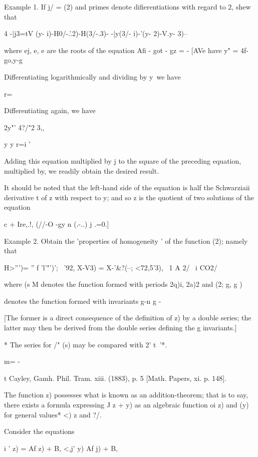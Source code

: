{Example 1. If j/ = (2) and primes denote difierentiations with regard
to 2, shew that

4 -|j3=tV (y- i)-H0/-.'.2)-H(3/-.3)- -|y(3/- i)-'(y- 2)-V.y- 3)--\

where ej, e, e are the roots of the equation Afi - got - gz = - [AVe
have y" = 4f-go,y-g

Differentiating logarithmically and dividing by y\ we have

r=\

Differentiating again, we have

2y"' 4?/"2 3,,

y y r=i '

Adding this equation multiplied by j to the square of the preceding
equation, multiplied by, we readily obtain the desired result.

It should be noted that the left-hand side of the equation is half the
Schwarziaii derivative t of z with respect to y; and so z is the
quotient of two solutions of the equation

c + Ire,.!, (//-O -gy n (.-..) j .=0.]

Example 2. Obtain the 'properties of homogeneity ' of the function
(2); namely that

 H>''')= '' f 'l'"')'; ~'92, X-V3) = X-'\&?(--; <72,5'3), \ 1 A 2/ \
i CO2/

where (s M denotes the function formed with periods 2q)i, 2a)2 and (2;
g, g )

denotes the function formed with invariants g-n g -

[The former is a direct consequence of the definition of z) by a
double series; the latter may then be derived from the double series
defining the g invariants.]

* The series for /" (s) may be compared with 2' t~'*.

m= -

t Cayley, Gamh. Phil. Tram. xiii. (1883), p. 5 [Math. Papers, xi. p.
148].

%
%


The function z) possesses what is known as an addition-theorem; that
is to say, there exists a formula expressing J z + y) as an algebraic
function oi z) and (y) for general values* <) z and ?/.

Consider the equations

i ' z) = Af z) + B, <,j' y) Af j) + B,

}
